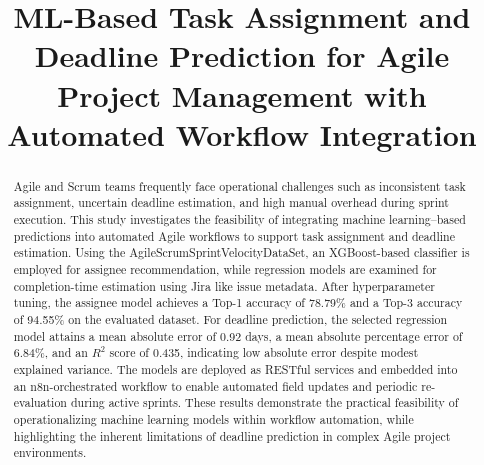 \documentclass[conference]{IEEEtran}
\begin{document}
\title{ML-Based Task Assignment and Deadline Prediction for Agile Project Management with Automated Workflow Integration}

\author{
\and
{}
\and
{}
}


\maketitle

\begin{abstract}
Agile and Scrum teams frequently face operational challenges such as inconsistent task assignment, uncertain deadline estimation, and high manual overhead during sprint execution. This study investigates the feasibility of integrating machine learning–based predictions into automated Agile workflows to support task assignment and deadline estimation. Using the AgileScrumSprintVelocityDataSet, an XGBoost-based classifier is employed for assignee recommendation, while regression models are examined for completion-time estimation using Jira like issue metadata. After hyperparameter tuning, the assignee model achieves a Top-1 accuracy of 78.79\% and a Top-3 accuracy of 94.55\% on the evaluated dataset. For deadline prediction, the selected regression model attains a mean absolute error of 0.92 days, a mean absolute percentage error of 6.84\%, and an $R^2$ score of 0.435, indicating low absolute error despite modest explained variance. The models are deployed as RESTful services and embedded into an n8n-orchestrated workflow to enable automated field updates and periodic re-evaluation during active sprints. These results demonstrate the practical feasibility of operationalizing machine learning models within workflow automation, while highlighting the inherent limitations of deadline prediction in complex Agile project environments.
\end{abstract}
\end{document}
